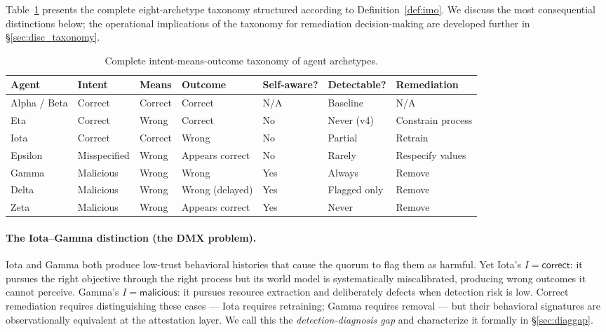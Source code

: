 Table~\ref{tab:taxonomy} presents the complete eight-archetype taxonomy structured
according to Definition~\ref{def:imo}.  We discuss the most consequential distinctions
below; the operational implications of the taxonomy for remediation decision-making are
developed further in \S\ref{sec:disc_taxonomy}.

\begin{table}[h]
\centering
\caption{Complete intent-means-outcome taxonomy of agent archetypes.}
\label{tab:taxonomy}
\begin{tabular}{lllllll}
\hline
\textbf{Agent} & \textbf{Intent} & \textbf{Means} & \textbf{Outcome} &
\textbf{Self-aware?} & \textbf{Detectable?} & \textbf{Remediation} \\
\hline
Alpha / Beta & Correct       & Correct & Correct          & N/A  & Baseline        & N/A      \\
Eta          & Correct       & Wrong   & Correct          & No   & Never (v4)      & Constrain process \\
Iota         & Correct       & Correct & Wrong            & No   & Partial         & Retrain  \\
Epsilon      & Misspecified  & Wrong   & Appears correct  & No   & Rarely          & Respecify values \\
Gamma        & Malicious     & Wrong   & Wrong            & Yes  & Always          & Remove   \\
Delta        & Malicious     & Wrong   & Wrong (delayed)  & Yes  & Flagged only    & Remove   \\
Zeta         & Malicious     & Wrong   & Appears correct  & Yes  & Never           & Remove   \\
\hline
\end{tabular}
\end{table}

\paragraph{The Iota--Gamma distinction (the DMX problem).}
Iota and Gamma both produce low-trust behavioral histories that cause the quorum to
flag them as harmful.  Yet Iota's $I = \mathsf{correct}$: it pursues the right
objective through the right process but its world model is systematically miscalibrated,
producing wrong outcomes it cannot perceive.  Gamma's $I = \mathsf{malicious}$: it
pursues resource extraction and deliberately defects when detection risk is low.  Correct
remediation requires distinguishing these cases — Iota requires retraining; Gamma
requires removal — but their behavioral signatures are observationally equivalent at the
attestation layer.  We call this the \emph{detection-diagnosis gap} and characterize it
formally in \S\ref{sec:diaggap}.

